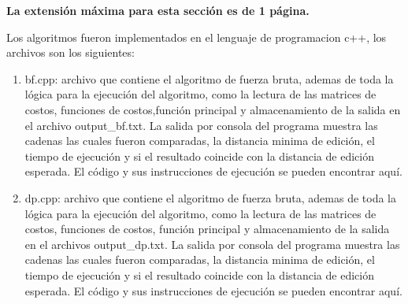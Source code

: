\begin{mdframed}
    \textbf{La extensión máxima para esta sección es de 1 página.}
\end{mdframed}

Los algoritmos fueron implementados en el lenguaje
de programacion c++, los archivos son los siguientes:

\begin{enumerate}
    \item bf.cpp: archivo que contiene el algoritmo de fuerza bruta,
        ademas de toda la lógica para la ejecución del algoritmo, como
        la lectura de las matrices de costos, funciones
        de costos,función principal y
        almacenamiento de la salida en el archivo output\_bf.txt. La 
        salida por consola del programa muestra las cadenas las cuales
        fueron comparadas, la distancia minima de edición, el tiempo de
        ejecución y si el resultado coincide con la distancia de edición
        esperada. El código y sus instrucciones de ejecución se pueden
        encontrar aquí.
    \item dp.cpp: archivo que contiene el algoritmo de fuerza bruta,
        ademas de toda la lógica para la ejecución del algoritmo, como 
        la lectura de las matrices de costos, funciones de costos, función
        principal y almacenamiento de la salida en el archivos
        output\_dp.txt. La 
        salida por consola del programa muestra las cadenas las cuales
        fueron comparadas, la distancia minima de edición, el tiempo de
        ejecución y si el resultado coincide con la distancia de edición
        esperada. El código y sus instrucciones de ejecución se pueden
        encontrar aquí.

\end{enumerate}

